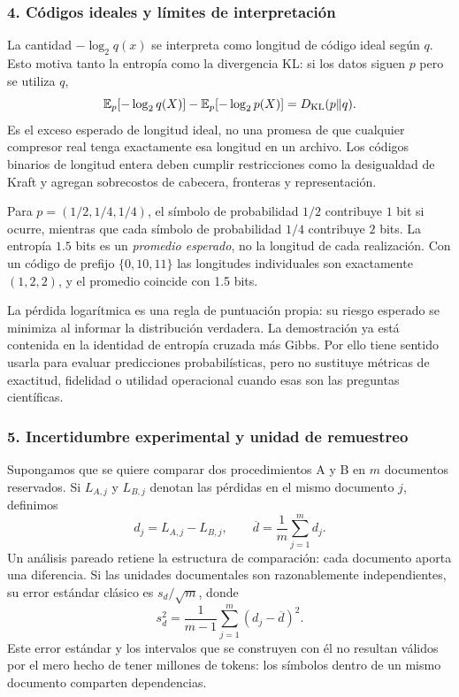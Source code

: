 \subsubsection*{4. Códigos ideales y límites de interpretación}

La cantidad $-\log_2q(x)$ se interpreta como longitud de código ideal
según $q$. Esto motiva tanto la entropía como la divergencia KL:
si los datos siguen $p$ pero se utiliza $q$,
\[
\mathbb E_p[-\log_2q(X)]-\mathbb E_p[-\log_2p(X)]
=D_{\rm KL}(p\|q).
\]
Es el exceso esperado de longitud ideal, no una promesa de que
cualquier compresor real tenga exactamente esa longitud en un archivo.
Los códigos binarios de longitud entera deben cumplir restricciones
como la desigualdad de Kraft y agregan sobrecostos de cabecera,
fronteras y representación.

\begin{ejemplo}
Para $p=(1/2,1/4,1/4)$, el símbolo de probabilidad $1/2$ contribuye
$1$ bit si ocurre, mientras que cada símbolo de probabilidad $1/4$
contribuye $2$ bits. La entropía $1.5$ bits es un \emph{promedio esperado},
no la longitud de cada realización. Con un código de prefijo
$\{0,10,11\}$ las longitudes individuales son exactamente $(1,2,2)$,
y el promedio coincide con 1.5 bits.
\end{ejemplo}

La pérdida logarítmica es una regla de puntuación propia: su riesgo
esperado se minimiza al informar la distribución verdadera.
La demostración ya está contenida en la identidad de entropía cruzada
más Gibbs. Por ello tiene sentido usarla para evaluar predicciones
probabilísticas, pero no sustituye métricas de exactitud, fidelidad o
utilidad operacional cuando esas son las preguntas científicas.

\subsubsection*{5. Incertidumbre experimental y unidad de remuestreo}

Supongamos que se quiere comparar dos procedimientos A y B en $m$
documentos reservados. Si $L_{A,j}$ y $L_{B,j}$ denotan las pérdidas
en el mismo documento $j$, definimos
\[
d_j=L_{A,j}-L_{B,j},\qquad \overline d=\frac1m\sum_{j=1}^m d_j.
\]
Un análisis pareado retiene la estructura de comparación: cada documento
aporta una diferencia. Si las unidades documentales son razonablemente
independientes, su error estándar clásico es $s_d/\sqrt m$, donde
\[
s_d^2=\frac1{m-1}\sum_{j=1}^m(d_j-\overline d)^2.
\]
Este error estándar y los intervalos que se construyen con él no
resultan válidos por el mero hecho de tener millones de tokens: los
símbolos dentro de un mismo documento comparten dependencias.


